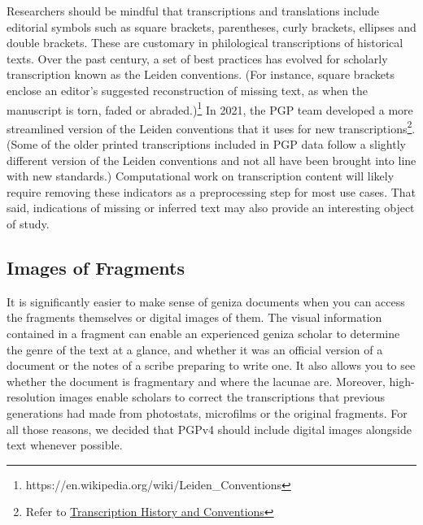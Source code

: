 \documentclass{article}
\begin{document}
Researchers should be mindful that transcriptions and translations include editorial symbols such as square brackets, parentheses, curly brackets, ellipses and double brackets. These are customary in philological transcriptions of historical texts. Over the past century, a set of best practices has evolved for scholarly transcription known as the Leiden conventions. (For instance, square brackets enclose an editor’s suggested reconstruction of missing text, as when the manuscript is torn, faded or abraded.)\footnote{https://en.wikipedia.org/wiki/Leiden\_Conventions} In 2021, the PGP team developed a more streamlined version of the Leiden conventions that it uses for new transcriptions\footnote{Refer to \href{https://docs.google.com/document/d/e/2PACX-1vR8kR4zZdnDZXjoLrYrABZn58PRyzrKfEiixQzE9vAzNfzI4Enxs0jU9KO5rTdiH1ZMTPwfqm31mFuX/pub}{Transcription History and Conventions}}. (Some of the older printed transcriptions included in PGP data follow a slightly different version of the Leiden conventions and not all have been brought into line with new standards.) Computational work on transcription content will likely require removing these indicators as a preprocessing step for most use cases. That said, indications of missing or inferred text may also provide an interesting object of study.

\subsection{Images of Fragments}

It is significantly easier to make sense of geniza documents when you can access the fragments themselves or digital images of them. The visual information contained in a fragment can enable an experienced geniza scholar to determine the genre of the text at a glance, and whether it was an official version of a document or the notes of a scribe preparing to write one. It also allows you to see whether the document is fragmentary and where the lacunae are. Moreover, high-resolution images enable scholars to correct the transcriptions that previous generations had made from photostats, microfilms or the original fragments. For all those reasons, we decided that PGPv4 should include digital images alongside text whenever possible. 
\end{document}
